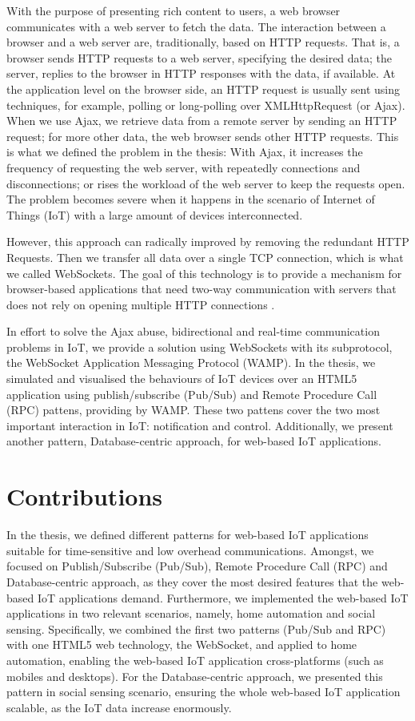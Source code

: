With the purpose of presenting rich content to users, a web browser communicates with a web server to fetch the data. The interaction between a browser and a web server are, traditionally, based on HTTP requests. That is, a browser sends HTTP requests to a web server, specifying the desired data; the server, replies to the browser in HTTP responses with the data, if available. At the application level on the browser side, an HTTP request is usually sent using techniques, for example, polling or long-polling over XMLHttpRequest (or Ajax). When we use Ajax, we retrieve data from a remote server by sending an HTTP request; for more other data, the web browser sends other HTTP requests. This is what we defined the problem in the thesis: With Ajax, it increases the frequency of requesting the web server, with repeatedly connections and disconnections; or rises the workload of the web server to keep the requests open. The problem becomes severe when it happens in the scenario of Internet of Things (IoT) with a large amount of devices interconnected.

However, this approach can radically improved by removing the redundant HTTP Requests. Then we transfer all data over a single TCP connection, which is what we called WebSockets. The goal of this technology is to provide a mechanism for browser-based applications that need two-way communication with servers that does not rely on opening multiple HTTP connections \cite{rfc64552012web}.

In effort to solve the Ajax abuse, bidirectional and real-time communication problems in IoT, we provide a solution using WebSockets with its subprotocol, the WebSocket Application Messaging Protocol (WAMP). In the thesis, we simulated and visualised the behaviours of IoT devices over an HTML5 application using publish/subscribe (Pub/Sub) and Remote Procedure Call (RPC) pattens, providing by WAMP. These two pattens cover the two most important interaction in IoT: notification and control. Additionally, we present another pattern, Database-centric approach, for web-based IoT applications. 

\section{Contributions}

In the thesis, we defined different patterns for web-based IoT applications suitable for time-sensitive and low overhead communications. Amongst, we focused on Publish/Subscribe (Pub/Sub), Remote Procedure Call (RPC) and Database-centric approach, as they cover the most desired features that the web-based IoT applications demand. Furthermore, we implemented the web-based IoT applications in two relevant scenarios, namely, home automation and social sensing. Specifically, we combined the first two patterns (Pub/Sub and RPC) with one HTML5 web technology, the WebSocket, and applied to home automation, enabling the web-based IoT application cross-platforms (such as mobiles and desktops). For the Database-centric approach, we presented this pattern in social sensing scenario, ensuring the whole web-based IoT application scalable, as the IoT data increase enormously.  

